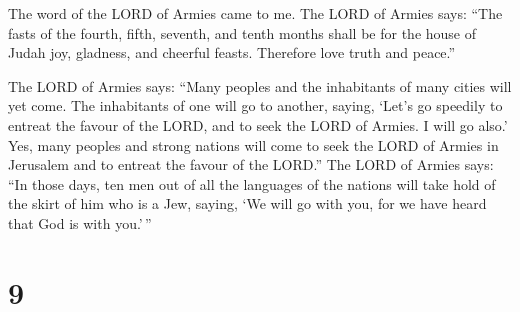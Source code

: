  The word of the LORD of Armies came to me. 
The LORD of Armies says: ``The fasts of the fourth, fifth, seventh, and
tenth months shall be for the house of Judah joy, gladness, and cheerful
feasts. Therefore love truth and peace.''

 The LORD of Armies says: ``Many peoples and the
inhabitants of many cities will yet come.  The inhabitants
of one will go to another, saying, `Let's go speedily to entreat the
favour of the LORD, and to seek the LORD of Armies. I will go also.'
 Yes, many peoples and strong nations will come to seek the
LORD of Armies in Jerusalem and to entreat the favour of the LORD.''
 The LORD of Armies says: ``In those days, ten men out of
all the languages of the nations will take hold of the skirt of him who
is a Jew, saying, `We will go with you, for we have heard that God is
with you.'\,''

\hypertarget{section-8}{%
\section{9}\label{section-8}}

